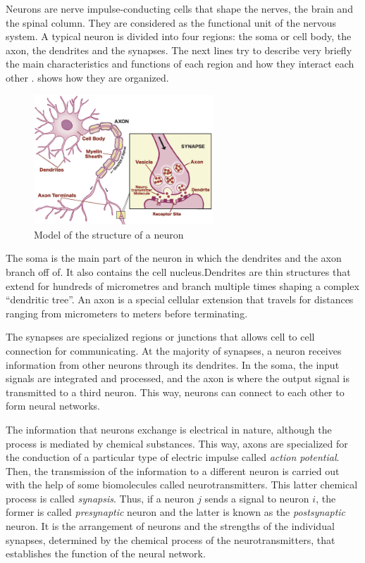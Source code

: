 \label{sec:BNN}

Neurons are nerve impulse-conducting cells that shape the nerves, the brain and the spinal column. They are considered as the functional unit of the nervous system. A typical neuron is divided into four regions: the soma or cell body, the axon, the dendrites and the synapses. The next lines try to describe very briefly the main characteristics and functions of each region and how they interact each other \cite{levitan2015neuron}.  shows how they are organized.

\begin{figure}[!ht]
\centering
\includegraphics[width=0.6\textwidth]{images/neuronstructure.jpg}
\caption{Model of the structure of a neuron}
\label{fig:neuronstructure}
\end{figure}

The soma is the main part of the neuron in which the dendrites and the axon branch off of. It also contains the cell nucleus.Dendrites are thin structures that extend for hundreds of micrometres and branch multiple times shaping a complex ``dendritic tree''. An axon is a special cellular extension that travels for distances ranging from micrometers to meters before terminating.

The synapses are specialized regions or junctions that allows cell to cell connection for communicating. At the majority of synapses, a neuron receives information from other neurons through its dendrites. In the soma, the input signals are integrated and processed, and the axon is where the output signal is transmitted to a third neuron. This way, neurons can connect to each other to form neural networks.

The information that neurons exchange is electrical in nature, although the process is mediated by chemical substances. 
This way, axons are specialized for the conduction of a particular type of electric impulse called \emph{action potential}.
Then, the transmission of the information to a different neuron is carried out with the help of some biomolecules called neurotransmitters. 
This latter chemical process is called \emph{synapsis}. 
Thus, if a neuron $j$ sends a signal to neuron $i$, the former is called \emph{presynaptic} neuron and the latter is known as the \emph{postsynaptic} neuron. 
It is the arrangement of neurons and the strengths of the individual synapses, determined by the chemical
process of the neurotransmitters, that establishes the function of the neural network.

